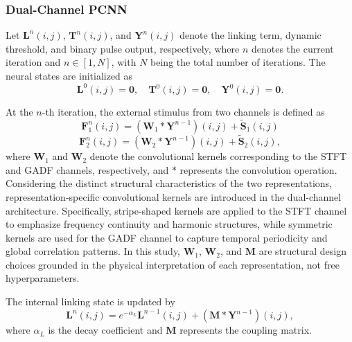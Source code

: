 \documentclass[journal]{IEEEtran}
\begin{document}
\subsubsection{Dual-Channel PCNN}
Let $\boldsymbol{L}^n(i,j)$, $\boldsymbol{T}^n(i,j)$, and $\boldsymbol{Y}^n(i,j)$ denote the linking term, dynamic threshold, and binary pulse output, respectively, where $n$ denotes the current iteration and $n \in [1, N]$, with $N$ being the total number of iterations. The neural states are initialized as
\begin{equation}
	\boldsymbol{L}^0(i,j) = \boldsymbol {0}, \quad 
	\boldsymbol{T}^0(i,j) = \boldsymbol {0}, \quad 
	\boldsymbol{Y}^0(i,j) = \boldsymbol {0}.
	\label{eq:initialization}
\end{equation}

At the $n$-th iteration, the external stimulus from two channels is defined as
\begin{equation}
	\boldsymbol{F}_1^n(i,j) = (\boldsymbol{W}_1 * \boldsymbol{Y}^{n-1})(i,j) + \boldsymbol{\tilde{S}}_1(i,j)
	\label{eq:f1_update}
\end{equation}
\begin{equation}
	\boldsymbol{F}_2^n(i,j) = (\boldsymbol{W}_2 * \boldsymbol{Y}^{n-1})(i,j) + \boldsymbol{\tilde{S}}_2(i,j),
	\label{eq:f2_update}
\end{equation}
where $\boldsymbol{W}_1$ and $\boldsymbol{W}_2$ denote the convolutional kernels corresponding to the STFT and GADF channels, respectively, and $*$ represents the convolution operation. Considering the distinct structural characteristics of the two representations, representation-specific convolutional kernels are introduced in the dual-channel architecture. Specifically, stripe-shaped kernels are applied to the STFT channel to emphasize frequency continuity and harmonic structures, while symmetric kernels are used for the GADF channel to capture temporal periodicity and global correlation patterns. In this study, $\boldsymbol{W}_1$, $\boldsymbol{W}_2$, and $\boldsymbol{M}$ are structural design choices grounded in the physical interpretation of each representation, not free hyperparameters.

The internal linking state is updated by
\begin{equation}
	\boldsymbol{L}^n(i,j) = e^{-\alpha_L} \boldsymbol{L}^{n-1}(i,j) + (\boldsymbol{M} * \boldsymbol{Y}^{n-1})(i,j),
	\label{eq:linking_update}
\end{equation}
where $\alpha_L$ is the decay coefficient and $\boldsymbol M$ represents the coupling matrix.
\end{document}
